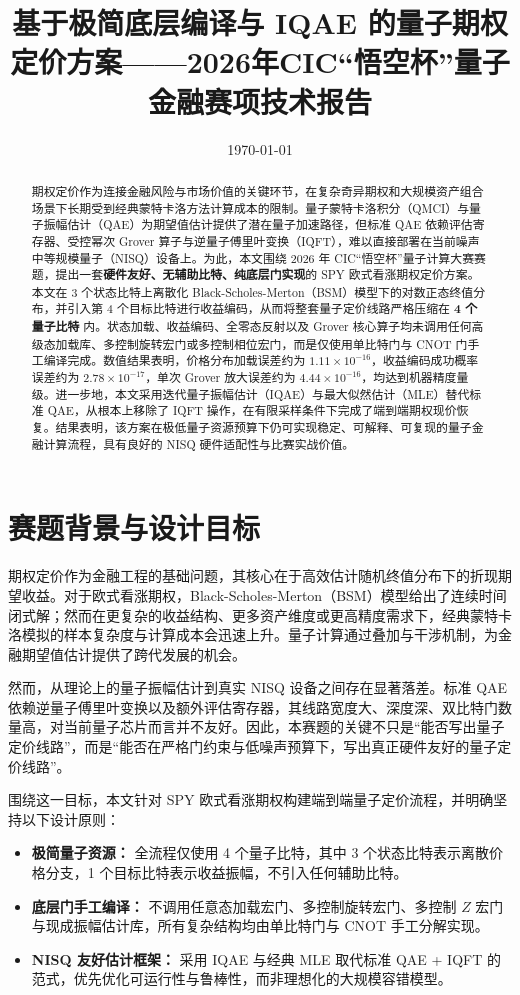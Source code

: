 \documentclass[12pt,a4paper]{ctexart}
\title{基于极简底层编译与 IQAE 的量子期权定价方案——2026年CIC“悟空杯”量子金融赛项技术报告}
\author{}
\date{\today}
\begin{document}
\maketitle

\begin{abstract}
期权定价作为连接金融风险与市场价值的关键环节，在复杂奇异期权和大规模资产组合场景下长期受到经典蒙特卡洛方法计算成本的限制。量子蒙特卡洛积分（QMCI）与量子振幅估计（QAE）为期望值估计提供了潜在量子加速路径，但标准 QAE 依赖评估寄存器、受控幂次 Grover 算子与逆量子傅里叶变换（IQFT），难以直接部署在当前噪声中等规模量子（NISQ）设备上。为此，本文围绕 2026 年 CIC“悟空杯”量子计算大赛赛题，提出一套\textbf{硬件友好、无辅助比特、纯底层门实现}的 SPY 欧式看涨期权定价方案。本文在 3 个状态比特上离散化 Black-Scholes-Merton（BSM）模型下的对数正态终值分布，并引入第 4 个目标比特进行收益编码，从而将整套量子定价线路严格压缩在 \textbf{4 个量子比特} 内。状态加载、收益编码、全零态反射以及 Grover 核心算子均未调用任何高级态加载库、多控制旋转宏门或多控制相位宏门，而是仅使用单比特门与 CNOT 门手工编译完成。数值结果表明，价格分布加载误差约为 $1.11\times 10^{-16}$，收益编码成功概率误差约为 $2.78\times 10^{-17}$，单次 Grover 放大误差约为 $4.44\times 10^{-16}$，均达到机器精度量级。进一步地，本文采用迭代量子振幅估计（IQAE）与最大似然估计（MLE）替代标准 QAE，从根本上移除了 IQFT 操作，在有限采样条件下完成了端到端期权现价恢复。结果表明，该方案在极低量子资源预算下仍可实现稳定、可解释、可复现的量子金融计算流程，具有良好的 NISQ 硬件适配性与比赛实战价值。
\end{abstract}

\section{赛题背景与设计目标}
期权定价作为金融工程的基础问题，其核心在于高效估计随机终值分布下的折现期望收益。对于欧式看涨期权，Black-Scholes-Merton（BSM）模型给出了连续时间闭式解；然而在更复杂的收益结构、更多资产维度或更高精度需求下，经典蒙特卡洛模拟的样本复杂度与计算成本会迅速上升。量子计算通过叠加与干涉机制，为金融期望值估计提供了跨代发展的机会。

然而，从理论上的量子振幅估计到真实 NISQ 设备之间存在显著落差。标准 QAE 依赖逆量子傅里叶变换以及额外评估寄存器，其线路宽度大、深度深、双比特门数量高，对当前量子芯片而言并不友好。因此，本赛题的关键不只是“能否写出量子定价线路”，而是“能否在严格门约束与低噪声预算下，写出真正硬件友好的量子定价线路”。

围绕这一目标，本文针对 SPY 欧式看涨期权构建端到端量子定价流程，并明确坚持以下设计原则：
\begin{itemize}[leftmargin=2em]
\item \textbf{极简量子资源：} 全流程仅使用 4 个量子比特，其中 3 个状态比特表示离散价格分支，1 个目标比特表示收益振幅，不引入任何辅助比特。
\item \textbf{底层门手工编译：} 不调用任意态加载宏门、多控制旋转宏门、多控制 $Z$ 宏门与现成振幅估计库，所有复杂结构均由单比特门与 CNOT 手工分解实现。
\item \textbf{NISQ 友好估计框架：} 采用 IQAE 与经典 MLE 取代标准 QAE + IQFT 的范式，优先优化可运行性与鲁棒性，而非理想化的大规模容错模型。
\end{itemize}
\end{document}
